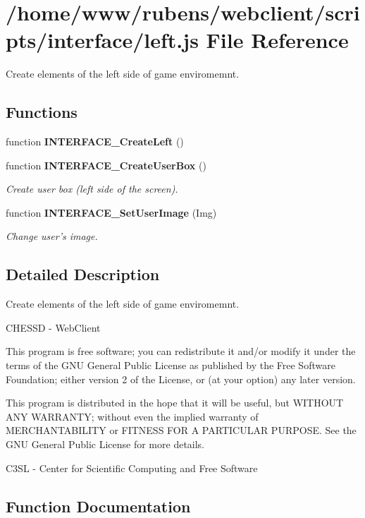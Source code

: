 \section{/home/www/rubens/webclient/scripts/interface/left.js File Reference}
\label{left_8js}
Create elements of the left side of game enviromemnt. 

\subsection*{Functions}
\begin{CompactItemize}
\item 
function {\bf INTERFACE\_\-CreateLeft} ()
\item 
function {\bf INTERFACE\_\-CreateUserBox} ()
\begin{CompactList}\small\item\em Create user box (left side of the screen). \item\end{CompactList}\item 
function {\bf INTERFACE\_\-SetUserImage} (Img)
\begin{CompactList}\small\item\em Change user's image. \item\end{CompactList}\end{CompactItemize}


\subsection{Detailed Description}
Create elements of the left side of game enviromemnt. 

CHESSD - WebClient

This program is free software; you can redistribute it and/or modify it under the terms of the GNU General Public License as published by the Free Software Foundation; either version 2 of the License, or (at your option) any later version.

This program is distributed in the hope that it will be useful, but WITHOUT ANY WARRANTY; without even the implied warranty of MERCHANTABILITY or FITNESS FOR A PARTICULAR PURPOSE. See the GNU General Public License for more details.

C3SL - Center for Scientific Computing and Free Software 

\subsection{Function Documentation}
